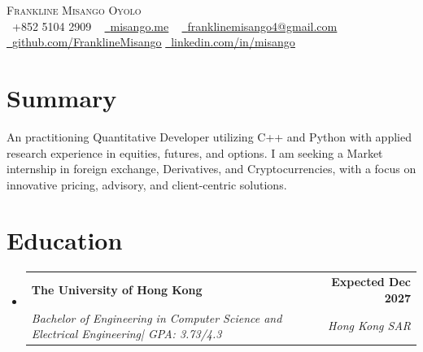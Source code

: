 \documentclass[letterpaper,11.9pt]{article}
\makeatletter
\newcommand{\resumeSubheading}[4]{
  \vspace{-2pt}\item
    \begin{tabular*}{1.0\textwidth}[t]{l@{\extracolsep{\fill}}r}
      \textbf{#1} & \textbf{\small #2} \\
      \textit{\small#3} & \textit{\small #4} \\
    \end{tabular*}\vspace{-7pt}
}
\newcommand{\resumeSubHeadingListStart}{\begin{itemize}[leftmargin=0.0in, label={}]}
\newcommand{\resumeSubHeadingListEnd}{\end{itemize}}
\makeatother
\begin{document}
\begin{center}
    {\Huge \scshape Frankline Misango Oyolo} \\ \vspace{1pt}
    \small \raisebox{-0.1\height}\faPhone\ +852 5104 2909 ~ 
    \href{https://misango.me/}{\raisebox{-0.2\height}\faGlobe\  
    \underline{misango.me}} ~ 
    \href{mailto:franklinemisango4@gmail.com}{\raisebox{-0.2\height}\faEnvelope\  \underline{franklinemisango4@gmail.com}} ~ 
    \href{https://github.com/FranklineMisango}{\raisebox{-0.2\height}\faGithub\ \underline{github.com/FranklineMisango}}
    \href{https://linkedin.com/in/misango}{\raisebox{-0.2\height}\faLinkedin\ \underline{linkedin.com/in/misango}} ~

    \vspace{-10pt}
\end{center}

\section{Summary}
\small
  An practitioning Quantitative Developer utilizing C++ and Python with applied research experience in equities, futures, and options. I am seeking a Market internship in foreign exchange, Derivatives, and Cryptocurrencies, with a focus on innovative pricing, advisory, and client-centric solutions.


\vspace{-11pt}

\section{Education}
  \resumeSubHeadingListStart
    \resumeSubheading
      {The University of Hong Kong}{ Expected Dec 2027}
      {Bachelor of Engineering in Computer Science and Electrical Engineering| GPA: 3.73/4.3}{Hong Kong SAR}
  \resumeSubHeadingListEnd
\vspace{-5pt}
\end{document}
